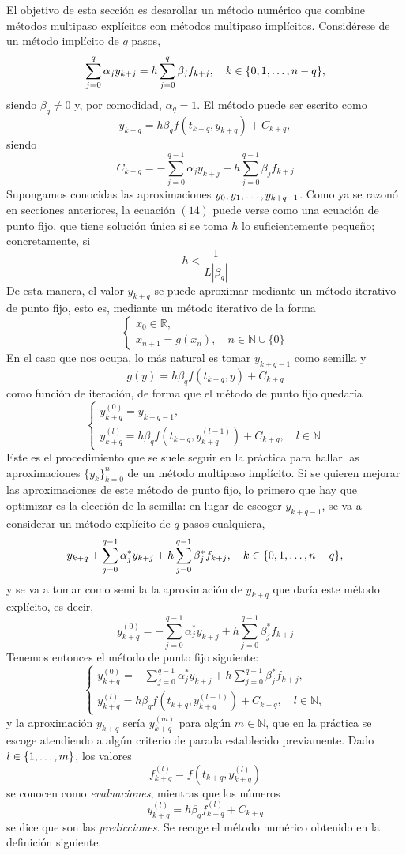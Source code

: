 \documentclass[11pt]{report}
\theoremstyle{mytheorem}
\theoremstyle{mydefinition}
\theoremstyle{myexample}
\newcommand{\R}{\mathbb R}
\newcommand{\N}{\mathbb N}
\begin{document}
El objetivo de esta sección es desarollar un método numérico que combine métodos multipaso explícitos con métodos multipaso implícitos. Considérese de un método implícito de $q$ pasos,
\[\sum_{j=0}^q \alpha_j y_{k+j} = h\sum_{j=0}^q \beta_j f_{k+j}, \quad k \in \{0,1,\mathellipsis,n-q\},\]
siendo $\beta_q \neq 0$ y, por comodidad, $\alpha_q = 1$. El método puede ser escrito como
\begin{equation}
y_{k+q} = h\beta_qf(t_{k+q},y_{k+q})+C_{k+q},\end{equation}
siendo
\[C_{k+q} = -\sum_{j=0}^{q-1}\alpha_jy_{k+j}+h\sum_{j=0}^{q-1}\beta_jf_{k+j}\]
Supongamos conocidas las aproximaciones $y_0,y_1,\mathellipsis,y_{k+q-1}$. Como ya se razonó en secciones anteriores, la ecuación $(14)$ puede verse como una ecuación de punto fijo, que tiene solución única si se toma $h$ lo suficientemente pequeño; concretamente, si
\[h <\frac{1}{L|\beta_q|}\]
De esta manera, el valor $y_{k+q}$ se puede aproximar mediante un método iterativo de punto fijo, esto es, mediante un método iterativo de la forma
\[\begin{cases}
    x_0 \in \R, \\
    x_{n+1} = g(x_n), \quad n \in \N \cup \{0\}
\end{cases}\]
En el caso que nos ocupa, lo más natural es tomar $y_{k+q-1}$ como semilla y \[g(y) = h\beta_qf(t_{k+q},y)+C_{k+q}\] como función de iteración, de forma que el método de punto fijo quedaría
\[\begin{cases}
y_{k+q}^{(0)} = y_{k+q-1}, \\
y_{k+q}^{(l)} = h\beta_qf(t_{k+q},y_{k+q}^{(l-1)})+C_{k+q}, \quad l \in \N
\end{cases}\]
Este es el procedimiento que se suele seguir en la práctica para hallar las aproximaciones $\{y_k\}_{k=0}^n$ de un método multipaso implícito. Si se quieren mejorar las aproximaciones de este método de punto fijo, lo primero que hay que optimizar es la elección de la semilla: en lugar de escoger $y_{k+q-1}$, se va a considerar un método explícito de $q$ pasos cualquiera,
\[y_{k+q}+\sum_{j=0}^{q-1} \alpha_j^* y_{k+j} + h\sum_{j=0}^{q-1} \beta_j^* f_{k+j}, \quad k \in \{0,1,\mathellipsis,n-q\},\]
y se va a tomar como semilla la aproximación de $y_{k+q}$ que daría este método explícito, es decir,
\[y_{k+q}^{(0)} = -\sum_{j=0}^{q-1} \alpha_j^* y_{k+j} + h\sum_{j=0}^{q-1} \beta_j^* f_{k+j}\]
Tenemos entonces el método de punto fijo siguiente:
\[\begin{cases}
\displaystyle y_{k+q}^{(0)} =-\sum_{j=0}^{q-1} \alpha_j^* y_{k+j} + h\sum_{j=0}^{q-1} \beta_j^* f_{k+j}, \\[5pt]
y_{k+q}^{(l)} = h\beta_qf(t_{k+q},y_{k+q}^{(l-1)})+C_{k+q}, \quad l \in \N,
\end{cases}\]
y la aproximación $y_{k+q}$ sería $y_{k+q}^{(m)}$ para algún $m \in \N$, que en la práctica se escoge atendiendo a algún criterio de parada establecido previamente. Dado $l \in \{1,\mathellipsis,m\}$, los valores
\[f_{k+q}^{(l)}=f(t_{k+q},y_{k+q}^{(l)})\]
se conocen como \emph{evaluaciones}, mientras que los números
\[y_{k+q}^{(l)}= h\beta_qf_{k+q}^{(l)}+C_{k+q}\]
se dice que son las \emph{predicciones}. Se recoge el método numérico obtenido en la definición siguiente.
\end{document}
